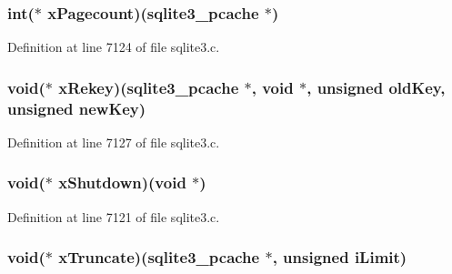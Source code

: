 \subsubsection[{x\+Pagecount}]{\setlength{\rightskip}{0pt plus 5cm}int($\ast$ x\+Pagecount)({\bf sqlite3\+\_\+pcache} $\ast$)}\label{structsqlite3__pcache__methods_a2b94d01bdb0e2496c486b48a37a00fea}


Definition at line 7124 of file sqlite3.\+c.

\hypertarget{structsqlite3__pcache__methods_a58ac2c2bfa7cc9811e46368ea0ea73f7}{}
\subsubsection[{x\+Rekey}]{\setlength{\rightskip}{0pt plus 5cm}void($\ast$ x\+Rekey)({\bf sqlite3\+\_\+pcache} $\ast$, void $\ast$, unsigned old\+Key, unsigned new\+Key)}\label{structsqlite3__pcache__methods_a58ac2c2bfa7cc9811e46368ea0ea73f7}


Definition at line 7127 of file sqlite3.\+c.

\hypertarget{structsqlite3__pcache__methods_a34a88425495f42099aadbe3fa9676a06}{}
\subsubsection[{x\+Shutdown}]{\setlength{\rightskip}{0pt plus 5cm}void($\ast$ x\+Shutdown)(void $\ast$)}\label{structsqlite3__pcache__methods_a34a88425495f42099aadbe3fa9676a06}


Definition at line 7121 of file sqlite3.\+c.

\hypertarget{structsqlite3__pcache__methods_a1c61888ab80e7d81e2815f0fea2d87a0}{}
\subsubsection[{x\+Truncate}]{\setlength{\rightskip}{0pt plus 5cm}void($\ast$ x\+Truncate)({\bf sqlite3\+\_\+pcache} $\ast$, unsigned i\+Limit)}\label{structsqlite3__pcache__methods_a1c61888ab80e7d81e2815f0fea2d87a0}


